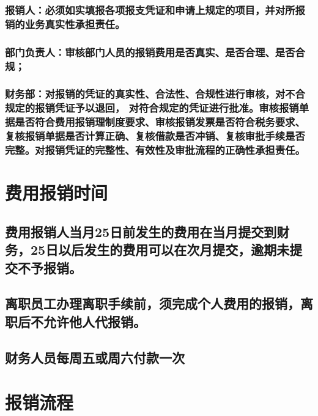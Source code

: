 \documentclass[]{article}
\begin{document}
\subsubsection{报销人：必须如实填报各项报支凭证和申请上规定的项目，并对所报销的业务真实性承担责任。}
\subsubsection{部门负责人：审核部门人员的报销费用是否真实、是否合理、是否合规；}
\subsubsection{财务部：对报销的凭证的真实性、合法性、合规性进行审核，对不合规定的报销凭证予以退回，
对符合规定的凭证进行批准。审核报销单据是否符合费用报销理制度要求、审核报销发票是否符合税务要求、
复核报销单据是否计算正确、复核借款是否冲销、复核审批手续是否完整。对报销凭证的完整性、有效性及审批流程的正确性承担责任。}

\section{费用报销时间}
\subsection{费用报销人当月25日前发生的费用在当月提交到财务，25日以后发生的费用可以在次月提交，逾期未提交不予报销。}
\subsection{离职员工办理离职手续前，须完成个人费用的报销，离职后不允许他人代报销。}
\subsection{财务人员每周五或周六付款一次}
\pagebreak

\section{报销流程}
\end{document}
